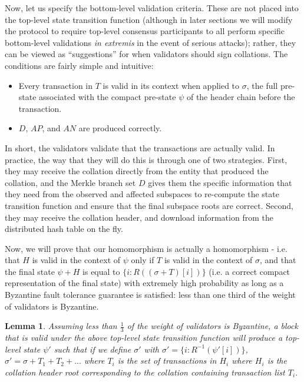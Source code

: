 \documentclass[11pt,a4paper]{article}
\makeatletter
\theoremstyle{plain}
\newtheorem{lem}[thm]{Lemma}
\theoremstyle{definition}
\theoremstyle{remark}
\newcommand{\ie}{i.e.\@\xspace}
\makeatother
\begin{document}
Now, let us specify the bottom-level validation criteria. These are not placed into the top-level state transition function (although in later sections we will modify the protocol to require top-level consensus participants to all perform specific bottom-level validations \emph{in extremis} in the event of serious attacks); rather, they can be viewed as ``suggestions'' for when validators should sign collations. The conditions are fairly simple and intuitive:

\begin{itemize}
\item
Every transaction in $T$ is valid in its context when applied to $\sigma$, the full pre-state associated with the compact pre-state $\psi$ of the header chain before the transaction.
\item
$D$, $AP$, and $AN$ are produced correctly.
\end{itemize}

In short, the validators validate that the transactions are actually valid. In practice, the way that they will do this is through one of two strategies. First, they may receive the collation directly from the entity that produced the collation, and the Merkle branch set $D$ gives them the specific information that they need from the observed and affected subspaces to re-compute the state transition function and ensure that the final subspace roots are correct. Second, they may receive the collation header, and download information from the distributed hash table on the fly.

Now, we will prove that our homomorphism is actually a homomorphism - \ie that $H$ is valid in the context of $\psi$ only if $T$ is valid in the context of $\sigma$, and that the final state $\psi + H$ is equal to $\{i: R((\sigma + T)[i])\}$ (\ie a correct compact representation of the final state) with extremely high probability as long as a Byzantine fault tolerance guarantee is satisfied: less than one third of the weight of validators is Byzantine. 

\begin{lem}
Assuming less than $\frac{1}{3}$ of the weight of validators is Byzantine, a block that is valid under the above top-level state transition function will produce a top-level state $\psi'$ such that if we define $\sigma'$ with $\sigma' = \{i: R^{-1}(\psi'[i])\}$, $\sigma' = \sigma + T_1 + T_2 + ...$ where $T_i$ is the set of transactions in $H_i$ where $H_i$ is the collation header root corresponding to the collation containing transaction list $T_i$.
\end{lem}
\end{document}
